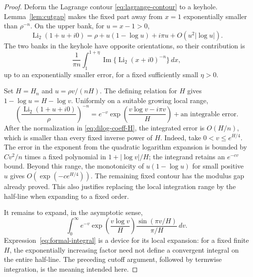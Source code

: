 \documentclass[11pt,a4paper]{article}
\numberwithin{equation}{section}
\theoremstyle{definition}
\theoremstyle{remark}
\DeclareMathOperator{\Li}{Li}
\DeclareMathOperator{\Ima}{Im}
\newcommand{\dd}{\,d}
\begin{document}
\begin{proof}
Deform the Lagrange contour \eqref{eq:lagrange-contour} to a keyhole.
Lemma~\ref{lem:cutgap} makes the fixed part away from \(x=1\)
exponentially smaller than \(\rho^{-n}\).
On the upper bank, for \(u=x-1>0\),
\begin{equation}
 \Li_2(1+u+i0)
 =\rho+u(1-\log u)+i\pi u+O(u^2|\log u|).
 \label{eq:dilogcut}
\end{equation}
The two banks in the keyhole have opposite orientations, so their
contribution is
\begin{equation}
 \frac1{\pi n}\int_1^{1+\eta}
 \Ima\{\Li_2(x+i0)^{-n}\}\dd x,
 \label{eq:cut-integral}
\end{equation}
up to an exponentially smaller error, for a fixed sufficiently small
\(\eta>0\).

Set \(H=H_n\) and \(u=\rho v/(nH)\).
The defining relation for \(H\) gives
\(1-\log u=H-\log v\).
Uniformly on a suitable growing local range,
\begin{equation}
 \left(\frac{\Li_2(1+u+i0)}{\rho}\right)^{-n}
 =
 e^{-v}\exp\left(\frac{v\log v-i\pi v}{H}\right)
 +\text{an integrable error}.
 \label{eq:local-cut-exp}
\end{equation}
After the normalization in \eqref{eq:dilog-coeff-H}, the integrated
error is \(O(H/n)\), which is smaller than every fixed inverse power
of \(H\).
Indeed, take \(0<v\le e^{H/4}\).
The error in the exponent from the quadratic logarithm expansion is
bounded by \(C v^2/n\) times a fixed polynomial in
\(1+|\log v|/H\); the integrand retains an \(e^{-cv}\) bound.
Beyond this range, the monotonicity of
\(u(1-\log u)\) for small positive \(u\) gives
\(O(\exp(-c e^{H/4}))\).
The remaining fixed contour has the modulus gap already proved.
This also justifies replacing the local integration range by the
half-line when expanding to a fixed order.

It remains to expand, in the asymptotic sense,
\begin{equation}
 \int_0^\infty e^{-v}
 \exp\left(\frac{v\log v}{H}\right)
 \frac{\sin(\pi v/H)}{\pi/H}\dd v.
 \label{eq:formal-integral}
\end{equation}
Expression~\eqref{eq:formal-integral} is a device for its local expansion:
for a fixed finite \(H\), the exponentially increasing factor need not
define a convergent integral on the entire half-line.
The preceding cutoff argument, followed by termwise integration,
is the meaning intended here.


\end{proof}
\end{document}
